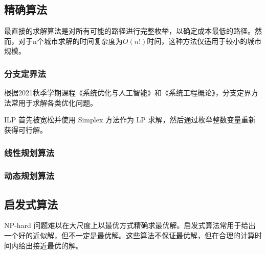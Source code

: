 \documentclass[lang=cn,11pt]{elegantpaper}
\begin{document}
\subsection{精确算法}
最直接的求解算法是对所有可能的路径进行完整枚举，以确定成本最低的路径。然而，对于n个城市求解的时间复杂度为$O(n!)$时间，这种方法仅适用于较小的城市规模。


\subsubsection{分支定界法}
根据2021秋季学期课程《系统优化与人工智能》和《系统工程概论》，分支定界方法常用于求解各类优化问题。

 ILP 首先被宽松并使用 Simplex 方法作为 LP 求解，然后通过枚举整数变量重新获得可行解。



\subsubsection{线性规划算法}


\subsubsection{动态规划算法}

\subsection{启发式算法}
NP-hard 问题难以在大尺度上以最优方式精确求最优解。启发式算法常用于给出一个好的近似解，但不一定是最优解。这些算法不保证最优解，但在合理的计算时间内给出接近最优的解。
\end{document}
